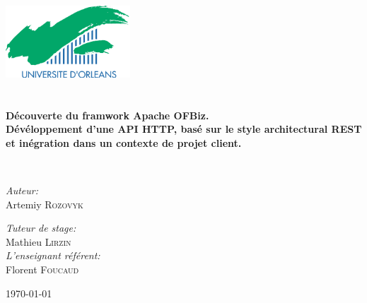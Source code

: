 \begin{titlepage}
\begin{center}

\includegraphics[width=0.35\textwidth]{./logo}~\\[1cm]


\textsc{\Large }\\[0.5cm]

\HRule \\[0.4cm]


{\huge \bfseries Découverte du framwork Apache OFBiz.\\
	Dévéloppement d'une API HTTP, basé sur le style architectural REST et inégration dans un contexte de projet client. \\[0.4cm] }

\HRule \\[1.5cm]


\begin{minipage}{0.4\textwidth}
\begin{flushleft} \large
\emph{Auteur:}\\
Artemiy \textsc{Rozovyk}\\
\thispagestyle{empty}
\end{flushleft}
\end{minipage}
\begin{minipage}{0.4\textwidth}
\thispagestyle{empty}
\begin{flushright} \large
\emph{Tuteur de stage:} \\
Mathieu \textsc{Lirzin}\\
\emph{L'enseignant référent:} \\
Florent \textsc{Foucaud}
\end{flushright}
\end{minipage}

\vfill

{\large \today}

\end{center}
\end{titlepage}